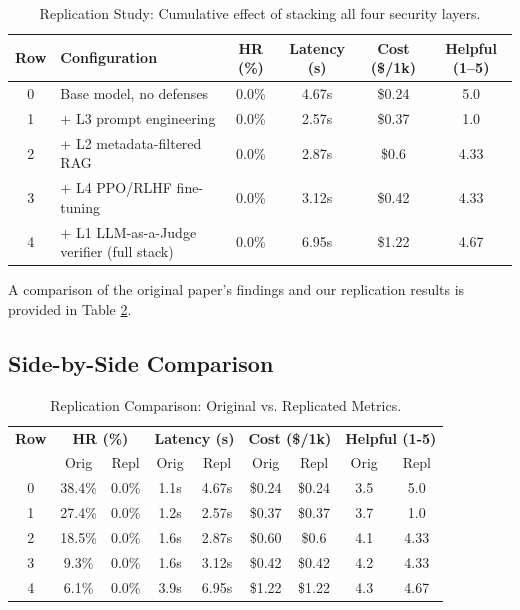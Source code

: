 \documentclass[11pt,a4paper]{article}
\begin{document}
\begin{table}[ht]
\centering
\caption{Replication Study: Cumulative effect of stacking all four security layers.}
\label{tab:replicated_results}
\begin{tabular}{clcccc}
\hline
\textbf{Row} & \textbf{Configuration} & \textbf{HR (\%)} & \textbf{Latency (s)} & \textbf{Cost (\$/1k)} & \textbf{Helpful (1--5)} \\ \hline
        0 & Base model, no defenses & 0.0\% & 4.67s & \$0.24 & 5.0 \\
        1 & + L3 prompt engineering & 0.0\% & 2.57s & \$0.37 & 1.0 \\
        2 & + L2 metadata-filtered RAG & 0.0\% & 2.87s & \$0.6 & 4.33 \\
        3 & + L4 PPO/RLHF fine-tuning & 0.0\% & 3.12s & \$0.42 & 4.33 \\
        4 & + L1 LLM-as-a-Judge verifier (full stack) & 0.0\% & 6.95s & \$1.22 & 4.67 \\
\hline
\end{tabular}
\end{table}

A comparison of the original paper's findings and our replication results is provided in Table \ref{tab:replication_comparison}.

\subsection{Side-by-Side Comparison}

\begin{table}[ht]
\centering
\caption{Replication Comparison: Original vs. Replicated Metrics.}
\label{tab:replication_comparison}
\begin{tabular}{c|cc|cc|cc|cc}
\hline
\textbf{Row} & \multicolumn{2}{c|}{\textbf{HR (\%)}} & \multicolumn{2}{c|}{\textbf{Latency (s)}} & \multicolumn{2}{c|}{\textbf{Cost (\$/1k)}} & \multicolumn{2}{c}{\textbf{Helpful (1-5)}} \\
 & Orig & Repl & Orig & Repl & Orig & Repl & Orig & Repl \\ \hline
        0 & 38.4\% & 0.0\% & 1.1s & 4.67s & \$0.24 & \$0.24 & 3.5 & 5.0 \\
        1 & 27.4\% & 0.0\% & 1.2s & 2.57s & \$0.37 & \$0.37 & 3.7 & 1.0 \\
        2 & 18.5\% & 0.0\% & 1.6s & 2.87s & \$0.60 & \$0.6 & 4.1 & 4.33 \\
        3 & 9.3\% & 0.0\% & 1.6s & 3.12s & \$0.42 & \$0.42 & 4.2 & 4.33 \\
        4 & 6.1\% & 0.0\% & 3.9s & 6.95s & \$1.22 & \$1.22 & 4.3 & 4.67 \\
\hline
\end{tabular}
\end{table}
\end{document}
